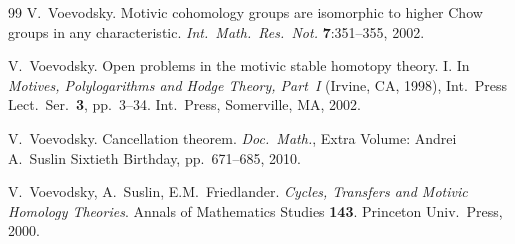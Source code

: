 \documentclass[12pt,a4paper]{article}
\theoremstyle{definition}
\begin{document}
\begin{thebibliography}{99}
V.\ Voevodsky. Motivic cohomology groups are isomorphic to higher Chow groups in
any characteristic. \textit{Int.\ Math.\ Res.\ Not.} \textbf{7}:351--355, 2002.

V.\ Voevodsky. Open problems in the motivic stable homotopy theory. I.
In \textit{Motives, Polylogarithms and Hodge Theory, Part~I} (Irvine, CA, 1998),
Int.\ Press Lect.\ Ser.\ \textbf{3}, pp.\ 3--34. Int.\ Press, Somerville, MA, 2002.

V.\ Voevodsky. Cancellation theorem. \textit{Doc.\ Math.}, Extra Volume: Andrei A.\
Suslin Sixtieth Birthday, pp.\ 671--685, 2010.

V.\ Voevodsky, A.\ Suslin, E.M.\ Friedlander. \textit{Cycles, Transfers and
Motivic Homology Theories}. Annals of Mathematics Studies \textbf{143}.
Princeton Univ.\ Press, 2000.

\end{thebibliography}
\end{document}
